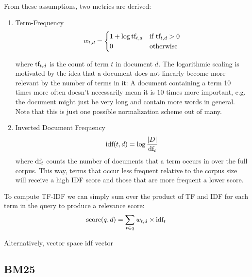 From these assumptions, two metrics are derived:
\begin{enumerate}
    \item Term-Frequency
          \begin{equation}
              w_{t,d} = \begin{cases}
                  1 + \log \text{tf}_{t, d} & \text{if } \text{tf}_{t, d} > 0 \\
                  0                       & \text{otherwise}              \\
              \end{cases}
          \end{equation}

          where $\text{tf}_{t, d}$ is the count of term $t$ in document $d$. The logarithmic scaling is motivated by the idea that a document does not linearly become more relevant by the number of terms in it: A document containing a term 10 times more often doesn't necessarily mean it is $10$ times more important, e.g. the document might just be very long and contain more words in general. Note that this is just one possible normalization scheme out of many.

    \item Inverted Document Frequency
          \begin{equation}
              \text{idf}(t, d) = \log \frac{|D|}{\text{df}_t}
          \end{equation}
          where $\text{df}_t$ counts the number of documents that a term occurs in over the full corpus. This way, terms that occur less frequent relative to the corpus size will receive a high IDF score and those that are more frequent a lower score.

\end{enumerate}

\begin{table}

\end{table}
To compute TF-IDF we can simply sum over the product of TF and IDF for each term in the query to produce a relevance score:
\begin{equation}
    \text{score}(q, d) = \sum_{t \in q} w_{t,d} \times \text{idf}_t
\end{equation}

Alternatively, vector space idf vector
\subsection{BM25}
\label{sec:bm25}

